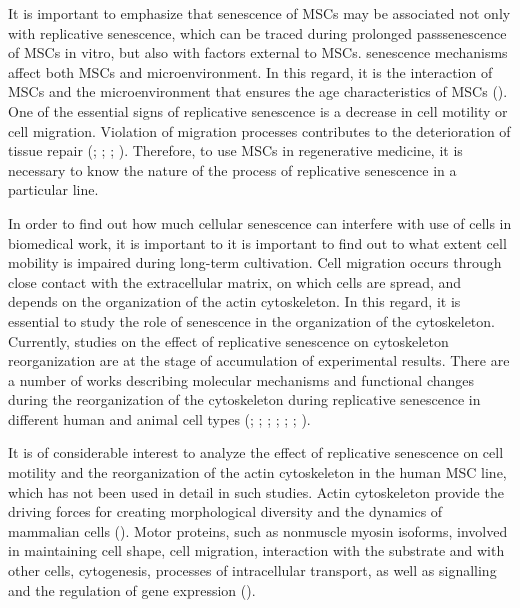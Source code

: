 \documentclass[alpha-refs]{wiley-article}
\begin{document}
It is important to emphasize that senescence of MSCs may be associated not only with replicative senescence, which can be traced during prolonged passsenescence of MSCs in vitro, but also with factors external to MSCs.
senescence mechanisms affect both MSCs and microenvironment.
In this regard, it is the interaction of MSCs and the microenvironment that ensures the age characteristics of MSCs (\cite{sethe2006senescence}).
One of the essential signs of replicative senescence is a decrease in cell motility or cell migration.
Violation of migration processes contributes to the deterioration of tissue repair (\cite{geissler2012functional}; \cite{bertolo2015vitro}; \cite{turinetto2016senescence}; \cite{zhang2018overexpression}).
Therefore, to use MSCs in regenerative medicine, it is necessary to know the nature of the process of replicative senescence in a particular line.


In order to find out how much cellular senescence can interfere with use of cells in biomedical work, it is important to  it is important to find out to what extent cell mobility is impaired during long-term cultivation.
Cell migration occurs through close contact with the extracellular matrix, on which cells are spread, and depends on the organization of the actin cytoskeleton.
In this regard, it is essential to study the role of senescence in the organization of the cytoskeleton.
Currently, studies on the effect of replicative senescence on cytoskeleton reorganization are at the stage of accumulation of experimental results.
There are a number of works describing molecular mechanisms and functional changes during the reorganization of the cytoskeleton during replicative senescence in different human and animal cell types (\cite{larsen2003phosphatases}; \cite{le2008regulation}; \cite{wang2009protein}; \cite{geissler2012functional}; \cite{ozcan2016unbiased}; \cite{turinetto2016senescence}; \cite{moujaber2019cellular}).

It is of considerable interest to analyze the effect of replicative senescence on cell motility and the reorganization of the actin cytoskeleton in the human MSC line, which has not been used in detail in such studies.
Actin cytoskeleton provide the driving forces for creating morphological diversity and the dynamics of mammalian cells (\cite{vasiliev1991polarization}).
Motor proteins, such as nonmuscle myosin isoforms, involved in maintaining cell shape, cell migration, interaction with the substrate and with other cells, cytogenesis, processes of intracellular transport, as well as signalling and the regulation of gene expression (\cite{omelchenko2002mechanisms}).
\end{document}
